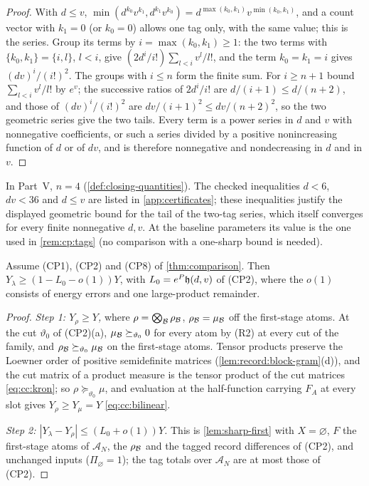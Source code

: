 \begin{proof}
With $d\le v$, $\min(d^{k_0}v^{k_1},d^{k_1}v^{k_0})=d^{\max(k_0,k_1)}
v^{\min(k_0,k_1)}$, and a count vector with $k_1=0$ (or $k_0=0$) allows one
tag only, with the same value; this is the series. Group its terms by
$i=\max(k_0,k_1)\ge1$: the two terms with $\{k_0,k_1\}=\{i,l\}$, $l<i$, give
$(2d^i/i!)\sum_{l<i}v^l/l!$, and the term $k_0=k_1=i$ gives
$(dv)^i/(i!)^2$. The groups with $i\le n$ form the finite sum. For $i\ge n+1$
bound $\sum_{l<i}v^l/l!$ by $e^v$; the successive ratios of $2d^i/i!$ are
$d/(i+1)\le d/(n+2)$, and those of $(dv)^i/(i!)^2$ are
$dv/(i+1)^2\le dv/(n+2)^2$, so the two geometric series give the two tails.
Every term is a power series in $d$ and $v$ with nonnegative coefficients,
or such a series divided by a positive nonincreasing function of $d$ or of
$dv$, and is therefore nonnegative and nondecreasing in $d$ and in $v$.
\end{proof}

In Part~V, $n=4$ (\cref{def:closing-quantities}). The checked
inequalities $d<6$, $dv<36$ and $d\le v$ are listed in
\cref{app:certificates}; these inequalities justify the displayed
geometric bound for the tail of the two-tag series, which itself converges
for every finite nonnegative $d,v$. At the baseline parameters its value
is the one used in \cref{rem:cp:tags} (no comparison with a
one-sharp bound is needed).

\begin{lemma}\label{lem:record:first-stage}
Assume (CP1), (CP2) and (CP8) of \cref{thm:comparison}. Then
$Y_\lambda\ge(1-L_0-o(1))Y$, with $L_0=e^P\mathfrak h(d,v)$ of (CP2), where the
$o(1)$ consists of energy errors and one large-product remainder.
\end{lemma}

\begin{proof}
\emph{Step 1: $Y_\rho\ge Y$,} where $\rho=\bigotimes_\mathcal B\rho_\mathcal B$, $\rho_\mathcal B=\mu_\mathcal B$
off the first-stage atoms. At the cut $\vartheta_0$ of (CP2)(a),
$\mu_\mathcal B\succeq_{\vartheta_0}0$ for every atom by (R2) at every cut of the
family, and $\rho_\mathcal B\succeq_{\vartheta_0}\mu_\mathcal B$ on the first-stage atoms.
Tensor products preserve the Loewner order of positive semidefinite matrices
(\cref{lem:record:block-gram}(d)), and the cut matrix of a product measure is
the tensor product of the cut matrices \eqref{eq:cc:kron}; so
$\rho\succeq_{\vartheta_0}\mu$, and evaluation at the half-function carrying
$F_A$ at every slot gives $Y_\rho\ge Y_\mu=Y$ \eqref{eq:cc:bilinear}.

\emph{Step 2: $|Y_\lambda-Y_\rho|\le(L_0+o(1))Y$.} This is
\cref{lem:sharp-first} with $X=\varnothing$, $F$ the first-stage atoms of
$\mathcal A_N$, the $\rho_\mathcal B$ and the tagged record differences of (CP2),
and unchanged inputs ($\Pi_\varnothing=1$); the tag totals over $\mathcal A_N$
are at most those of (CP2).
\end{proof}

